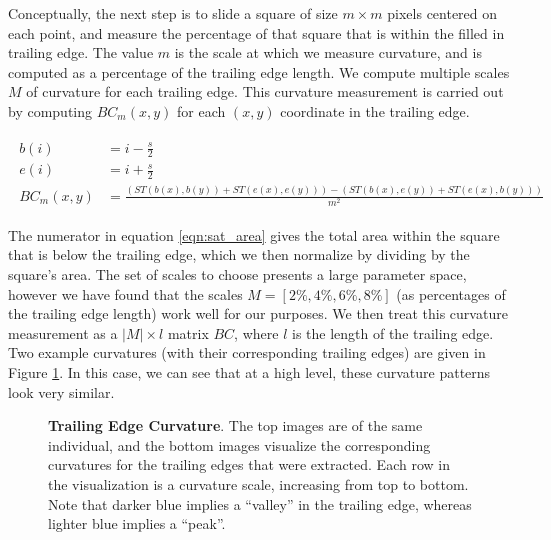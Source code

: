 Conceptually, the next step is to slide a square of size $m \times m$ pixels centered on each point, and measure the percentage of that square that is within the filled in trailing edge.
The value $m$ is the scale at which we measure curvature, and is computed as a percentage of the trailing edge length.
We compute multiple scales $M$ of curvature for each trailing edge.
This curvature measurement is carried out by computing $BC_m(x, y)$ for each $(x, y)$ coordinate in the trailing edge.

\begin{align} \label{eqn:sat_area}
\begin{split}
b(i) &= i - \frac{s}{2}\\
e(i) &= i + \frac{s}{2}\\
BC_m(x,y) &= \frac{(ST(b(x), b(y)) + ST(e(x), e(y))) - (ST(b(x), e(y)) + ST(e(x), b(y)))}{m^2}
\end{split}
\end{align}

The numerator in equation \eqref{eqn:sat_area} gives the total area within the square that is below the trailing edge, which we then normalize by dividing by the square's area.
The set of scales to choose presents a large parameter space, however we have found that the scales $M = [2\%, 4\%, 6\%, 8\%]$ (as percentages of the trailing edge length) work well for our purposes.
We then treat this curvature measurement as a $|M| \times l$ matrix $BC$, where $l$ is the length of the trailing edge.
Two example curvatures (with their corresponding trailing edges) are given in Figure \ref{fig:example_curv}.
In this case, we can see that at a high level, these curvature patterns look very similar.

\begin{figure}[t]%
\centering
{}
\newline
{}
\caption{\textbf{Trailing Edge Curvature}. The top images are of the same individual, and the bottom images visualize the corresponding curvatures for the trailing edges that were extracted. Each row in the visualization is a curvature scale, increasing from top to bottom. Note that darker blue implies a ``valley'' in the trailing edge, whereas lighter blue implies a ``peak''.}
\label{fig:example_curv}
\end{figure}

